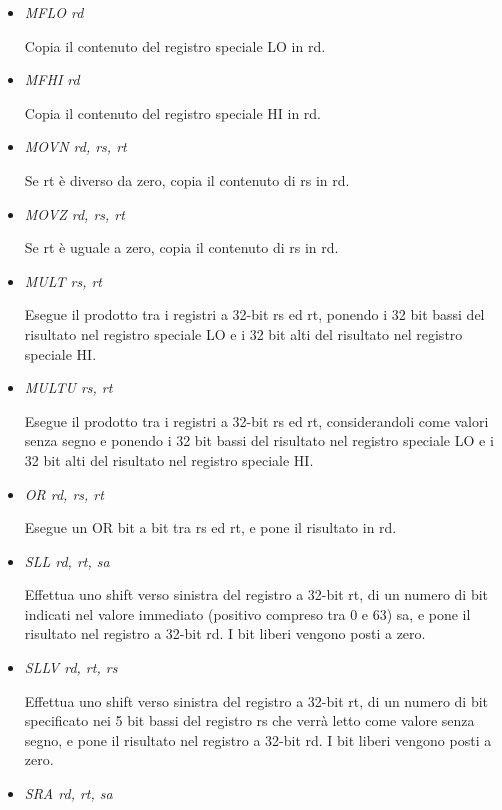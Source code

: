 \documentclass[letterpaper,10pt,english]{sphinxmanual}
\begin{document}
\begin{itemize}
\item {} 
\emph{MFLO rd}

Copia il contenuto del registro speciale LO in rd.

\item {} 
\emph{MFHI rd}

Copia il contenuto del registro speciale HI in rd.

\item {} 
\emph{MOVN rd, rs, rt}

Se rt è diverso da zero, copia il contenuto di rs in rd.

\item {} 
\emph{MOVZ rd, rs, rt}

Se rt è uguale a zero, copia il contenuto di rs in rd.

\item {} 
\emph{MULT rs, rt}

Esegue il prodotto tra i registri a 32-bit rs ed rt, ponendo i 32 bit bassi
del risultato nel registro speciale LO e i 32 bit alti del risultato nel
registro speciale HI.

\item {} 
\emph{MULTU rs, rt}

Esegue il prodotto tra i registri a 32-bit rs ed rt, considerandoli come
valori senza segno e ponendo i 32 bit bassi del risultato nel registro
speciale LO e i 32 bit alti del risultato nel registro speciale HI.

\item {} 
\emph{OR rd, rs, rt}

Esegue un OR bit a bit tra rs ed rt, e pone il risultato in rd.

\item {} 
\emph{SLL rd, rt, sa}

Effettua uno shift verso sinistra del registro a 32-bit rt, di un numero di
bit indicati nel valore immediato (positivo compreso tra 0 e 63) sa, e pone
il risultato nel registro a 32-bit rd. I bit liberi vengono posti a zero.

\item {} 
\emph{SLLV rd, rt, rs}

Effettua uno shift verso sinistra del registro a 32-bit rt, di un numero di
bit specificato nei 5 bit bassi del registro rs che verrà letto come
valore senza segno, e pone il risultato nel registro a 32-bit rd. I bit
liberi vengono posti a zero.

\item {} 
\emph{SRA rd, rt, sa}


\end{itemize}
\end{document}
